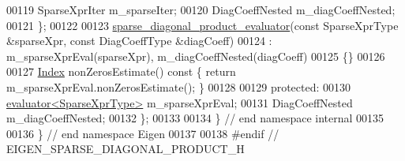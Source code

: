\begin{DoxyCode}
00119     SparseXprIter m\_sparseIter;
00120     DiagCoeffNested m\_diagCoeffNested;
00121   \};
00122   
00123   \hyperlink{struct_eigen_1_1internal_1_1sparse__diagonal__product__evaluator}{sparse\_diagonal\_product\_evaluator}(\textcolor{keyword}{const} SparseXprType &sparseXpr, \textcolor{keyword}{const} 
      DiagCoeffType &diagCoeff)
00124     : m\_sparseXprEval(sparseXpr), m\_diagCoeffNested(diagCoeff)
00125   \{\}
00126 
00127   \hyperlink{namespace_eigen_a62e77e0933482dafde8fe197d9a2cfde}{Index} nonZerosEstimate()\textcolor{keyword}{ const }\{ \textcolor{keywordflow}{return} m\_sparseXprEval.nonZerosEstimate(); \}
00128     
00129 \textcolor{keyword}{protected}:
00130   \hyperlink{struct_eigen_1_1internal_1_1evaluator}{evaluator<SparseXprType>} m\_sparseXprEval;
00131   DiagCoeffNested m\_diagCoeffNested;
00132 \};
00133 
00134 \} \textcolor{comment}{// end namespace internal}
00135 
00136 \} \textcolor{comment}{// end namespace Eigen}
00137 
00138 \textcolor{preprocessor}{#endif // EIGEN\_SPARSE\_DIAGONAL\_PRODUCT\_H}
\end{DoxyCode}
